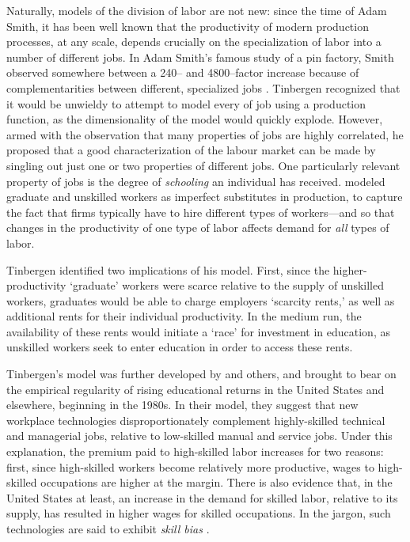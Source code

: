Naturally, models of the division of labor are not new: since the time of Adam Smith, it has been well known that the productivity of modern production processes, at any scale, depends crucially on the specialization of labor into a number of different jobs. In Adam Smith's famous study of a pin factory, Smith observed somewhere between a 240-- and 4800--factor increase because of complementarities between different, specialized jobs \citet[I.3]{Smith1776}. Tinbergen recognized that it would be unwieldy to attempt to model every of job using a production function, as the dimensionality of the model would quickly explode. However, armed with the observation that many properties of jobs are highly correlated, he proposed that a good characterization of the labour market can be made by singling out just one or two properties of different jobs. One particularly relevant property of jobs is the degree of {\em schooling} an individual has received. \citet{Tinbergen1974} modeled graduate and unskilled workers as imperfect substitutes in production, to capture the fact that firms typically have to hire different types of workers---and so that changes in the productivity of one type of labor affects demand for {\em all} types of labor.

Tinbergen identified two implications of his model. First, since the higher-productivity `graduate' workers were scarce relative to the supply of unskilled workers, graduates would be able to charge employers `scarcity rents,' as well as additional rents for their individual productivity. In the medium run, the availability of these rents would initiate a `race' for investment in education, as unskilled workers seek to enter education in order to access these rents.

Tinbergen's model was further developed by \citet{Katz1992} and others, and brought to bear on the empirical regularity of rising educational returns in the United States and elsewhere, beginning in the 1980s. In their model, they suggest that new workplace technologies disproportionately complement highly-skilled technical and managerial jobs, relative to low-skilled manual and service jobs. Under this explanation, the premium paid to high-skilled labor increases for two reasons: first, since high-skilled workers become relatively more productive, wages to high-skilled occupations are higher at the margin. There is also evidence that, in the United States at least, an increase in the demand for skilled labor, relative to its supply, has resulted in higher wages for skilled occupations. In the jargon, such technologies are said to exhibit \emph{skill bias} \citep{Autor2006}.

